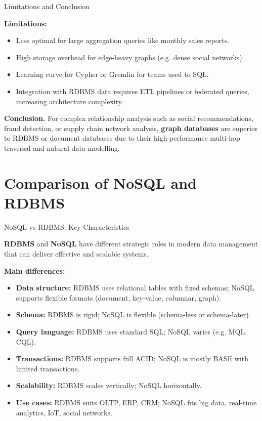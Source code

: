 \documentclass[aspectratio=169, table]{beamer}
\begin{document}
\begin{frame}{Limitations and Conclusion}
	\vspace{20pt}
	
	\textbf{Limitations:}
	\begin{itemize}
		\item Less optimal for large aggregation queries like monthly sales reports.
		\item High storage overhead for edge-heavy graphs (e.g. dense social networks).
		\item Learning curve for Cypher or Gremlin for teams used to SQL.
		\item Integration with RDBMS data requires ETL pipelines or federated queries, increasing architecture complexity.
	\end{itemize}
	
	\vspace{10pt}
	\textbf{Conclusion.} For complex relationship analysis such as social recommendations, fraud detection, or supply chain network analysis, \textbf{graph databases} are superior to RDBMS or document databases due to their high-performance multi-hop traversal and natural data modelling.
	
\end{frame}

\section{Comparison of NoSQL and RDBMS}

\begin{frame}{NoSQL vs RDBMS: Key Characteristics}
	\vspace{20pt}
	
	\textbf{RDBMS} and \textbf{NoSQL} have different strategic roles in modern data management that can deliver effective and scalable systems.
	
	\vspace{5pt}
	\textbf{Main differences:}
	
	\begin{itemize}
		\item \textbf{Data structure:} RDBMS uses relational tables with fixed schemas; NoSQL supports flexible formats (document, key-value, columnar, graph).
		\item \textbf{Schema:} RDBMS is rigid; NoSQL is flexible (schema-less or schema-later).
		\item \textbf{Query language:} RDBMS uses standard SQL; NoSQL varies (e.g. MQL, CQL).
		\item \textbf{Transactions:} RDBMS supports full ACID; NoSQL is mostly BASE with limited transactions.
		\item \textbf{Scalability:} RDBMS scales vertically; NoSQL horizontally.
		\item \textbf{Use cases:} RDBMS suits OLTP, ERP, CRM; NoSQL fits big data, real-time analytics, IoT, social networks.
	\end{itemize}
	
\end{frame}
\end{document}
